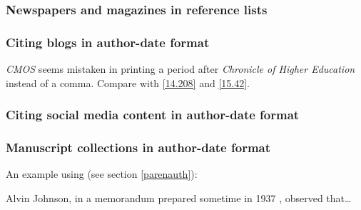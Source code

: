 \documentclass[11pt,letterpaper,oneside]{article}
\begin{document}
\subsubsection{Newspapers and magazines in reference lists}

\begin{citeref}
\item \parencite{nytimes2002}
\end{citeref}

\setcounter{subsubsection}{50}
\subsubsection{Citing blogs in author-date format}
\label{15.51}

\textit{CMOS} seems mistaken in printing a period after
\textit{Chronicle of Higher Education} instead of a comma. Compare
with \ref{14.208} and \ref{15.42}.

\begin{citeref}
\item \parencite{germano2017}
\end{citeref}

\subsubsection{Citing social media content in author-date format}
\label{15.52}

\begin{citeref}
\item \parencite{diaz2016}
\item \parencite{obrien2015}
\item \parencite{chicago2015}
\end{citeref}

\setcounter{subsubsection}{53}
\subsubsection{Manuscript collections in author-date format}
\label{15.54}

An example using  (see section \ref{parenauth}):

\begin{citeref}
\item Alvin Johnson, in a memorandum prepared sometime in 1937
, observed that\ldots
\end{citeref}
\end{document}
